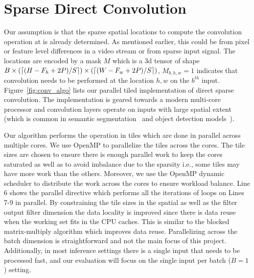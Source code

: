 \documentclass{article}
\begin{document}
\section{Sparse Direct Convolution}
Our assumption is that the sparse spatial locations to compute the convolution
operation at is already determined. As mentioned earlier, this could be from
pixel or feature level differences in a video stream or from sparse input
signal. The locations are encoded by a mask $M$ which is a 3d tensor of shape $B
\times (\lceil (H - F_h + 2P)/S \rceil) \times (\lceil (W - F_w + 2P)/S \rceil)$, $M_{b,h,w} =
1$ indicates that convolution needs to be performed at the location $h, w$ on
the $b^{th}$ input. Figure~\ref{fig:conv_algo} lists our parallel tiled
implementation of direct sparse convolution. The implementation is geared
towards a modern multi-core processor and convolution layers operate on inputs
with large spatial extent (which is common in semantic
segmentation~\cite{long2015fully} and object detection
models~\cite{he2017mask}). 

Our algorithm performs the operation in tiles which are done in parallel across
multiple cores. We use OpenMP to parallelize the tiles across the cores. The
tile sizes are chosen to ensure there is enough parallel work to keep the cores
saturated as well as to avoid imbalance due to the sparsity i.e., some tiles may
have more work than the others. Moreover, we use the OpenMP dynamic scheduler to
distribute the work across the cores to ensure workload balance. Line 6 shows
the parallel directive which performs all the iterations of loops on Lines 7-9
in parallel. By constraining the tile sizes in the spatial as well as the filter
output filter dimension the data locality is improved since there is data reuse
when the working set fits in the CPU caches.  This is similar to the blocked
matrix-multiply algorithm which improves data reuse.  Parallelizing across
the batch dimension is straightforward and not the main focus of this project. 
Additionally, in most inference settings there is a single input that needs to 
be processed fast, and our evaluation will focus on the single input per batch
 ($B=1$) setting.
\end{document}

